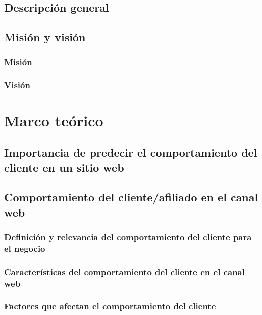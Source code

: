 \documentclass[letterpaper, 12pt]{report}
\begin{document}
\section{Descripción general}


\section{Misión y visión}
\subsection{Misión}

\subsection{Visión}


\chapter{Marco teórico}

\section{Importancia de predecir el comportamiento del cliente en un sitio web}


\section{Comportamiento del cliente/afiliado en el canal web}
\subsection{Definición y relevancia del comportamiento del cliente para el negocio}


\subsection{Características del comportamiento del cliente en el canal web}


\subsection{Factores que afectan el comportamiento del cliente}

\end{document}

